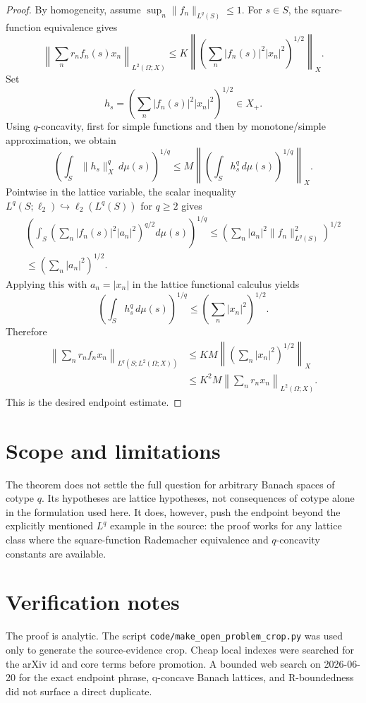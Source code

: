 \documentclass[11pt]{amsart}
\begin{document}
\begin{proof}
By homogeneity, assume $\sup_n\|f_n\|_{L^q(S)}\leq 1$.  For $s\in S$, the
square-function equivalence gives
\[
\left\|\sum_n r_n f_n(s)x_n\right\|_{L^2(\Omega;X)}
\leq
K\left\|\left(\sum_n |f_n(s)|^2|x_n|^2\right)^{1/2}\right\|_X.
\]
Set
\[
h_s=\left(\sum_n |f_n(s)|^2|x_n|^2\right)^{1/2}\in X_+.
\]
Using $q$-concavity, first for simple functions and then by monotone/simple
approximation, we obtain
\[
\left(\int_S \|h_s\|_X^q\,d\mu(s)\right)^{1/q}
\leq
M\left\|\left(\int_S h_s^q\,d\mu(s)\right)^{1/q}\right\|_X.
\]
Pointwise in the lattice variable, the scalar inequality
$L^q(S;\ell_2)\hookrightarrow \ell_2(L^q(S))$ for $q\geq2$ gives
\begin{multline*}
\left(\int_S \left(\sum_n |f_n(s)|^2 |a_n|^2\right)^{q/2}d\mu(s)\right)^{1/q}
\leq
\left(\sum_n |a_n|^2\|f_n\|_{L^q(S)}^2\right)^{1/2}\\
\leq
\left(\sum_n |a_n|^2\right)^{1/2}.
\end{multline*}
Applying this with $a_n=|x_n|$ in the lattice functional calculus yields
\[
\left(\int_S h_s^q\,d\mu(s)\right)^{1/q}
\leq
\left(\sum_n |x_n|^2\right)^{1/2}.
\]
Therefore
\begin{align*}
\left\|\sum_n r_n f_n x_n\right\|_{L^q(S;L^2(\Omega;X))}
&\leq
KM\left\|\left(\sum_n |x_n|^2\right)^{1/2}\right\|_X\\
&\leq
K^2M\left\|\sum_n r_nx_n\right\|_{L^2(\Omega;X)}.
\end{align*}
This is the desired endpoint estimate.
\end{proof}

\section*{Scope and limitations}

The theorem does not settle the full question for arbitrary Banach spaces of
cotype $q$.  Its hypotheses are lattice hypotheses, not consequences of cotype
alone in the formulation used here.  It does, however, push the endpoint
beyond the explicitly mentioned $L^q$ example in the source: the proof works
for any lattice class where the square-function Rademacher equivalence and
$q$-concavity constants are available.

\section*{Verification notes}

The proof is analytic.  The script
\texttt{code/make\_open\_problem\_crop.py} was used only to generate the
source-evidence crop.  Cheap local indexes were searched for the arXiv id and
core terms before promotion.  A bounded web search on 2026-06-20 for the exact
endpoint phrase, q-concave Banach lattices, and R-boundedness did not surface
a direct duplicate.
\end{document}
